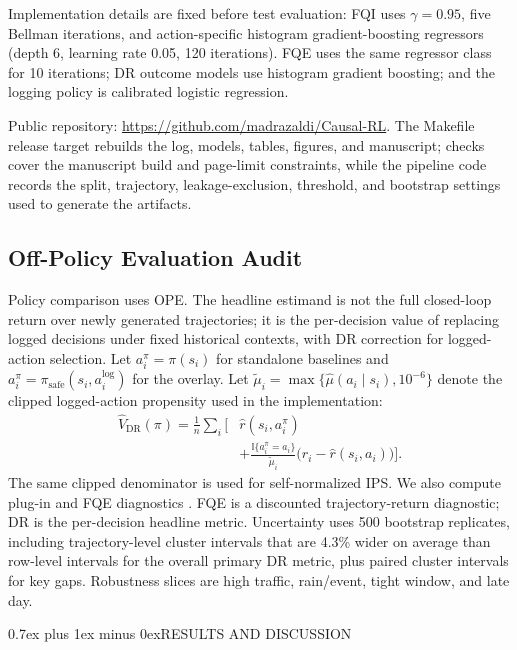 \documentclass[a4paper,conference]{IEEEtran}
\makeatletter
\def\section{\@startsection{section}{1}{\z@}{1.5ex plus 1.5ex minus 0.5ex}%
  {0.7ex plus 1ex minus 0ex}{\normalfont\normalsize\centering}}
\makeatother
\begin{document}
Implementation details are fixed before test evaluation: FQI uses $\gamma=0.95$, five Bellman iterations, and action-specific histogram gradient-boosting regressors (depth 6, learning rate 0.05, 120 iterations). FQE uses the same regressor class for 10 iterations; DR outcome models use histogram gradient boosting; and the logging policy is calibrated logistic regression.

Public repository: \url{https://github.com/madrazaldi/Causal-RL}. The Makefile release target rebuilds the log, models, tables, figures, and manuscript; checks cover the manuscript build and page-limit constraints, while the pipeline code records the split, trajectory, leakage-exclusion, threshold, and bootstrap settings used to generate the artifacts.

\subsection{Off-Policy Evaluation Audit}
Policy comparison uses OPE. The headline estimand is not the full closed-loop return over newly generated trajectories; it is the per-decision value of replacing logged decisions under fixed historical contexts, with DR correction for logged-action selection. Let $a_i^\pi=\pi(s_i)$ for standalone baselines and $a_i^\pi=\pi_{\text{safe}}(s_i,a_i^{\text{log}})$ for the overlay. Let $\tilde{\mu}_i=\max\{\hat{\mu}(a_i \mid s_i),10^{-6}\}$ denote the clipped logged-action propensity used in the implementation:
\begin{align}
\hat{V}_{\text{DR}}(\pi) = \frac{1}{n}\sum_i \Bigg[ &\hat{r}(s_i, a_i^\pi) \nonumber \\
&+ \frac{\mathbb{I}\{a_i^\pi = a_i\}}{\tilde{\mu}_i} \big(r_i - \hat{r}(s_i, a_i)\big) \Bigg].
\label{eq:dr}
\end{align}
The same clipped denominator is used for self-normalized IPS. We also compute plug-in and FQE diagnostics \cite{dudik2011dr,jiang2016doubly,thomas2016dataefficient,le2019batch,kallus2020double}. FQE is a discounted trajectory-return diagnostic; DR is the per-decision headline metric. Uncertainty uses 500 bootstrap replicates, including trajectory-level cluster intervals that are 4.3\% wider on average than row-level intervals for the overall primary DR metric, plus paired cluster intervals for key gaps. Robustness slices are high traffic, rain/event, tight window, and late day.

\section{RESULTS AND DISCUSSION}
\label{sec:results}
\end{document}
